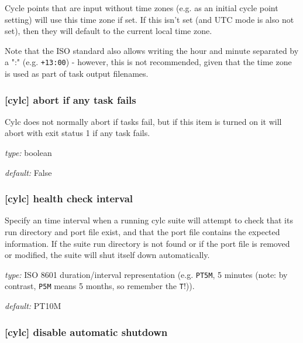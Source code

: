 Cycle points that are input without time zones (e.g. as an initial cycle point
setting) will use this time zone if set. If this isn't set (and UTC mode is
also not set), then they will default to the current local time zone.

Note that the ISO standard also allows writing the hour and minute separated
by a ":" (e.g. \lstinline=+13:00=) - however, this is not recommended, given
that the time zone is used as part of task output filenames.

\subsubsection[abort if any task fails]{[cylc] \textrightarrow abort if any task fails}

Cylc does not normally abort if tasks fail, but if this item is turned
on it will abort with exit status 1 if any task fails.

\begin{myitemize}
    \item {\em type:} boolean
    \item {\em default:} False
\end{myitemize}

\subsubsection[health check interval]{[cylc] \textrightarrow health check interval}
\label{health-check-interval}

Specify an time interval when a running cylc suite will attempt to check that
its run directory and port file exist, and that the port file contains the
expected information. If the suite run directory is not found or if the port
file is removed or modified, the suite will shut itself down automatically.

\begin{myitemize}
    \item {\em type:} ISO 8601 duration/interval representation (e.g.
 \lstinline=PT5M=, 5 minutes (note: by contrast, \lstinline=P5M= means 5
 months, so remember the \lstinline=T=!)).
    \item {\em default:} PT10M
\end{myitemize}

\subsubsection[disable automatic shutdown]{[cylc] \textrightarrow disable automatic shutdown}

